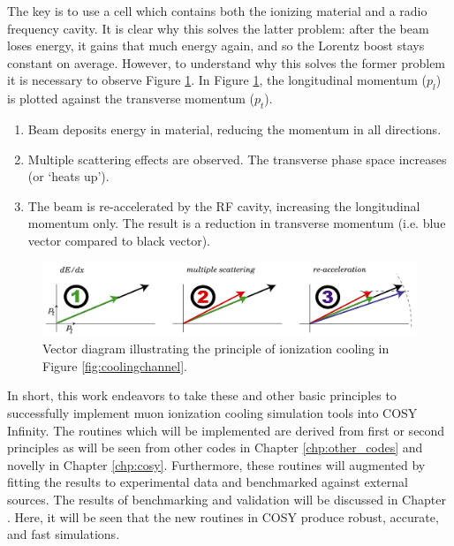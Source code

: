 The key is to use a cell which contains both the ionizing material and a radio frequency cavity. It is clear why this solves the latter problem: after the beam loses energy, it gains that much energy again, and so the Lorentz boost stays constant on average. However, to understand why this solves the former problem it is necessary to observe Figure \ref{fig:123ionization}. In Figure \ref{fig:123ionization}, the longitudinal momentum ($p_l$) is plotted against the transverse momentum ($p_t$). 
   \begin{enumerate} 
  \item{Beam deposits energy in material, reducing the momentum in all directions.}
  \item{Multiple scattering effects are observed. The transverse phase space increases (or `heats up'). }
  \item{The beam is re-accelerated by the RF cavity, increasing the longitudinal momentum only. The result is a reduction in transverse momentum (i.e. blue vector compared to black vector).}
\end{enumerate}

\begin{figure}
  \centering
   \captionsetup{singlelinecheck=off}
    \includegraphics[width=\textwidth]{Figures/123ionization} 
  \caption{Vector diagram illustrating the principle of ionization cooling in Figure \ref{fig:coolingchannel}. }
  \label{fig:123ionization}
\end{figure}

\par

In short, this work endeavors to take these and other basic principles to successfully implement muon ionization cooling simulation tools into COSY Infinity. The routines which will be implemented are derived from first or second principles as will be seen from other codes in Chapter \ref{chp:other_codes} and novelly in Chapter \ref{chp:cosy}. Furthermore, these routines will augmented by fitting the results to experimental data and benchmarked against external sources. The results of benchmarking and validation will be discussed in Chapter \label{chp:results}. Here, it will be seen that the new routines in COSY produce robust, accurate, and fast simulations.